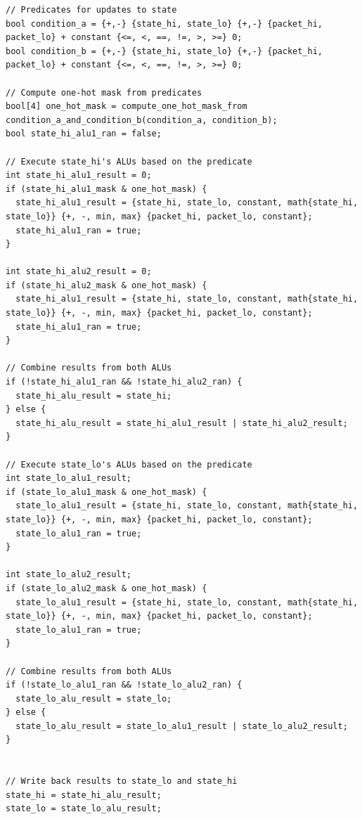 \begin{tiny}
\begin{verbatim}
// Predicates for updates to state
bool condition_a = {+,-} {state_hi, state_lo} {+,-} {packet_hi, packet_lo} + constant {<=, <, ==, !=, >, >=} 0;
bool condition_b = {+,-} {state_hi, state_lo} {+,-} {packet_hi, packet_lo} + constant {<=, <, ==, !=, >, >=} 0;

// Compute one-hot mask from predicates
bool[4] one_hot_mask = compute_one_hot_mask_from condition_a_and_condition_b(condition_a, condition_b);
bool state_hi_alu1_ran = false;

// Execute state_hi's ALUs based on the predicate
int state_hi_alu1_result = 0;
if (state_hi_alu1_mask & one_hot_mask) {
  state_hi_alu1_result = {state_hi, state_lo, constant, math{state_hi, state_lo}} {+, -, min, max} {packet_hi, packet_lo, constant};
  state_hi_alu1_ran = true;
}

int state_hi_alu2_result = 0;
if (state_hi_alu2_mask & one_hot_mask) {
  state_hi_alu1_result = {state_hi, state_lo, constant, math{state_hi, state_lo}} {+, -, min, max} {packet_hi, packet_lo, constant};
  state_hi_alu1_ran = true;
}

// Combine results from both ALUs
if (!state_hi_alu1_ran && !state_hi_alu2_ran) {
  state_hi_alu_result = state_hi;
} else {
  state_hi_alu_result = state_hi_alu1_result | state_hi_alu2_result;
}

// Execute state_lo's ALUs based on the predicate
int state_lo_alu1_result;
if (state_lo_alu1_mask & one_hot_mask) {
  state_lo_alu1_result = {state_hi, state_lo, constant, math{state_hi, state_lo}} {+, -, min, max} {packet_hi, packet_lo, constant};
  state_lo_alu1_ran = true;
}

int state_lo_alu2_result;
if (state_lo_alu2_mask & one_hot_mask) {
  state_lo_alu1_result = {state_hi, state_lo, constant, math{state_hi, state_lo}} {+, -, min, max} {packet_hi, packet_lo, constant};
  state_lo_alu1_ran = true;
}

// Combine results from both ALUs
if (!state_lo_alu1_ran && !state_lo_alu2_ran) {
  state_lo_alu_result = state_lo;
} else {
  state_lo_alu_result = state_lo_alu1_result | state_lo_alu2_result;
}


// Write back results to state_lo and state_hi
state_hi = state_hi_alu_result;
state_lo = state_lo_alu_result;

\end{verbatim}
\end{tiny}
